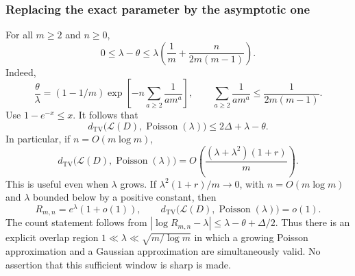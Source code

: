 \documentclass[11pt,letterpaper]{article}
\numberwithin{equation}{subsection}
\theoremstyle{definition}
\theoremstyle{remark}
\theoremstyle{plain}
\newcommand{\Poi}{\operatorname{Poisson}}
\newcommand{\TV}{d_{\mathrm{TV}}}
\begin{document}
\subsubsection{Replacing the exact parameter by the asymptotic one}
For all $m\ge2$ and $n\ge0$,
\begin{equation}\label{a122:pd:eq:thetalam}
 0\le\lambda-\theta\le
 \lambda\left(\frac1m+\frac{n}{2m(m-1)}\right).
\end{equation}
Indeed,
\[
 \frac\theta\lambda=(1-1/m)
 \exp\!\left[-n\sum_{a\ge2}\frac1{a m^a}\right],\qquad
 \sum_{a\ge2}\frac1{a m^a}\le\frac1{2m(m-1)}.
\]
Use $1-e^{-x}\le x$. It follows that
\begin{equation}\label{a122:pd:eq:TVlambda}
 \TV\bigl(\mathcal L(D),\Poi(\lambda)\bigr)
 \le2\Delta+\lambda-\theta.
\end{equation}
In particular, if $n=O(m\log m)$,
\begin{equation}\label{a122:pd:eq:growingwindow}
 \TV\bigl(\mathcal L(D),\Poi(\lambda)\bigr)
 =O\!\left(\frac{(\lambda+\lambda^2)(1+r)}m\right).
\end{equation}
This is useful even when $\lambda$ grows. If
$\lambda^2(1+r)/m\to0$, with $n=O(m\log m)$ and $\lambda$ bounded
below by a positive constant, then
\begin{equation}\label{a122:pd:eq:growingcount}
 R_{m,n}=e^\lambda(1+o(1)),\qquad
 \TV\bigl(\mathcal L(D),\Poi(\lambda)\bigr)=o(1).
\end{equation}
The count statement follows from
$|\log R_{m,n}-\lambda|\le\lambda-\theta+\Delta/2$.
Thus there is an explicit overlap region
$1\ll\lambda\ll\sqrt{m/\log m}$ in which a growing Poisson
approximation and a Gaussian approximation are simultaneously valid.
No assertion that this sufficient window is sharp is made.
\end{document}
